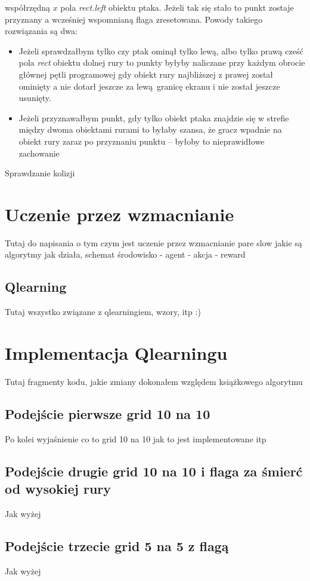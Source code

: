 \documentclass[a4paper,12pt,oneside]{book}
\begin{document}
współrzędną $x$ pola \textit{rect.left} obiektu ptaka. Jeżeli tak się stało to
punkt zostaje przyznany a wcześniej wspomnianą flaga zresetowana. Powody
takiego rozwiązania są dwa:
\begin{itemize}
	\item Jeżeli sprawdzałbym tylko czy ptak ominął tylko lewą, albo tylko
		prawą cześć pola \textit{rect} obiektu dolnej rury to punkty
		byłyby naliczane przy każdym obrocie głównej pętli programowej
		gdy obiekt rury najbliższej z prawej został ominięty a nie
		dotarł jeszcze za lewą granicę ekranu i nie został jeszcze
		usunięty.
	\item Jeżeli przyznawałbym punkt, gdy tylko obiekt ptaka znajdzie się
		w strefie między dwoma obiektami rurami to byłaby szansa, że
		gracz wpadnie na obiekt rury zaraz po przyznaniu punktu --
		byłoby to nieprawidłowe zachowanie
\end{itemize}

Sprawdzanie kolizji

\chapter{Uczenie przez wzmacnianie}
Tutaj do napisania o tym czym jest uczenie przez wzmacnianie pare slow jakie są algorytmy
jak działa, schemat środowisko - agent - akcja - reward
\section{Q\dywiz learning}
Tutaj wszystko związane z qlearningiem, wzory, itp :)

\chapter{Implementacja Q\dywiz learningu}
\label{chapter:implementacja_qlearningu}
Tutaj fragmenty kodu, jakie zmiany dokonałem względem książkowego algorytmu
\section{Podejście pierwsze grid 10 na 10}
Po kolei wyjaśnienie co to grid 10 na 10 jak to jest implementowane itp
\section{Podejście drugie grid 10 na 10 i flaga za śmierć od wysokiej rury}
Jak wyżej
\section{Podejście trzecie grid 5 na 5 z flagą}
Jak wyżej
\end{document}
